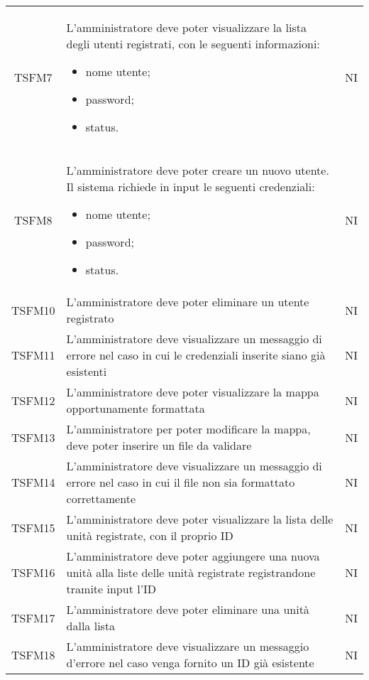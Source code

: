 \begin{longtable}[h!] { c  m{12cm} c}
		TSFM7 & L'amministratore deve poter visualizzare la lista degli utenti registrati, con le seguenti informazioni:
					\begin{itemize}
						\item nome utente;
						\item password;
						\item status.
					\end{itemize}
									& NI \\
		TSFM8 & L'amministratore deve poter creare un nuovo utente. Il sistema richiede in input le seguenti credenziali:
					\begin{itemize}
						\item nome utente;
						\item password;
						\item status.
					\end{itemize}
										& NI \\

		TSFM10 & L'amministratore deve poter eliminare un utente registrato & NI \\

		TSFM11 & L'amministratore deve visualizzare un messaggio di errore nel caso in cui le credenziali inserite siano già esistenti & NI \\
		
		TSFM12   & L'amministratore deve poter visualizzare la mappa opportunamente formattata & NI\\

		TSFM13   & L'amministratore per poter modificare la mappa, deve poter inserire un file da validare & NI\\

		TSFM14 & L'amministratore deve visualizzare un messaggio di errore nel caso in cui il file non sia formattato correttamente & NI \\

		TSFM15   & L'amministratore deve poter visualizzare la lista delle unità registrate, con il proprio ID & NI\\

		TSFM16 & L'amministratore deve poter aggiungere una nuova unità alla liste delle unità registrate registrandone tramite input l'ID & NI\\

		TSFM17 & L'amministratore deve poter eliminare una unità dalla lista & NI\\

		TSFM18  & L'amministratore deve visualizzare un messaggio d'errore nel caso venga fornito un ID già esistente & NI \\


\end{longtable}
